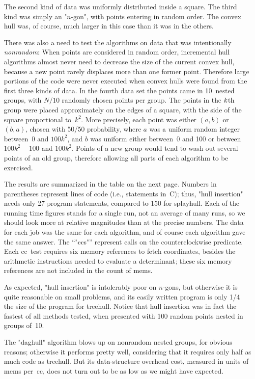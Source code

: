The second kind of data was uniformly distributed inside a square. The
third kind was simply an "$n$-gon", with points entering in random order.
The convex hull was, of course, much larger in this case than it was in
the others.

There was also a need to test the algorithms on data that was
intentionally {\it nonrandom\/}: When points are considered in random
order, incremental hull algorithms almost never need to decrease the
size of the current convex hull, because a new point rarely displaces
more than one former point. Therefore large portions of the code were
never executed when convex hulls were found from the first three kinds 
of data. In the fourth data set the points came in 10~nested groups,
with $N/10$ randomly chosen points per group. The points in the
$k\/$th group were placed approximately on the edges of a square, with
the side of the square proportional to~$k^2$. More precisely, each
point was either $(a,b)$ or $(b,a)$, chosen with 50/50 probability,
where $a$ was a uniform random integer between~0 and $100k^2$, and $b$
was uniform either between~0 and 100 or between $100k^2-100$ and
$100k^2$. Points of a new group would tend to wash out several points
of an old group, therefore allowing all parts of each algorithm to be
exercised. 

The results are summarized in the table on the next page. Numbers in
parentheses represent lines of code (i.e., statements in~{\ninerm C});
thus, "hull insertion" needs only 27
program statements, compared to 150 for splayhull.
Each of the running time figures stands for a single run, not an
average of many runs, so we should look more at relative magnitudes
than at the precise numbers. The data for each job was the same for
each algorithm, and of course each algorithm gave the same answer. 
The ``"ccs"'' represent calls on the counterclockwise predicate. Each cc~test
 requires six memory references to fetch coordinates, besides the
arithmetic instructions needed to evaluate a determinant; these six
memory references are not included in the count of mems.

As expected, "hull insertion" is intolerably poor on $n$-gons, but
otherwise it is quite reasonable on small problems, and its easily
written program is only 1/4 the size of the program for treehull.
Notice that hull insertion was in fact the fastest of all methods tested, when
presented with 100 random points nested in groups of~10. 

The "daghull" algorithm blows up on nonrandom nested groups,
for obvious reasons; otherwise it performs pretty well, considering
that it requires only half as much code as treehull. But its
data-structure overhead cost, measured in units of mems per~cc, does
not turn out to be as low as we might have expected.

